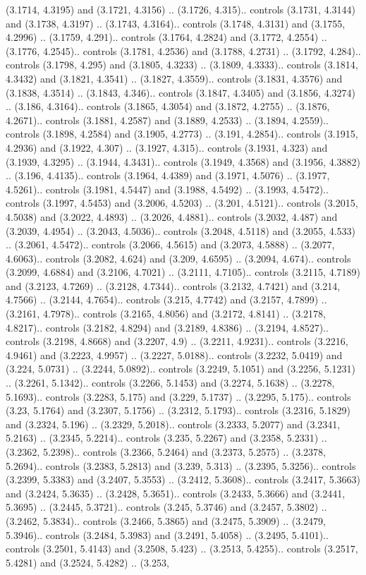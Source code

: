 (3.1714, 4.3195) and (3.1721, 4.3156) .. (3.1726, 4.315).. controls (3.1731, 4.3144) and (3.1738, 4.3197) .. (3.1743, 4.3164).. controls (3.1748, 4.3131) and (3.1755, 4.2996) .. (3.1759, 4.291).. controls (3.1764, 4.2824) and (3.1772, 4.2554) .. (3.1776, 4.2545).. controls (3.1781, 4.2536) and (3.1788, 4.2731) .. (3.1792, 4.284).. controls (3.1798, 4.295) and (3.1805, 4.3233) .. (3.1809, 4.3333).. controls (3.1814, 4.3432) and (3.1821, 4.3541) .. (3.1827, 4.3559).. controls (3.1831, 4.3576) and (3.1838, 4.3514) .. (3.1843, 4.346).. controls (3.1847, 4.3405) and (3.1856, 4.3274) .. (3.186, 4.3164).. controls (3.1865, 4.3054) and (3.1872, 4.2755) .. (3.1876, 4.2671).. controls (3.1881, 4.2587) and (3.1889, 4.2533) .. (3.1894, 4.2559).. controls (3.1898, 4.2584) and (3.1905, 4.2773) .. (3.191, 4.2854).. controls (3.1915, 4.2936) and (3.1922, 4.307) .. (3.1927, 4.315).. controls (3.1931, 4.323) and (3.1939, 4.3295) .. (3.1944, 4.3431).. controls (3.1949, 4.3568) and (3.1956, 4.3882) .. (3.196, 4.4135).. controls (3.1964, 4.4389) and (3.1971, 4.5076) .. (3.1977, 4.5261).. controls (3.1981, 4.5447) and (3.1988, 4.5492) .. (3.1993, 4.5472).. controls (3.1997, 4.5453) and (3.2006, 4.5203) .. (3.201, 4.5121).. controls (3.2015, 4.5038) and (3.2022, 4.4893) .. (3.2026, 4.4881).. controls (3.2032, 4.487) and (3.2039, 4.4954) .. (3.2043, 4.5036).. controls (3.2048, 4.5118) and (3.2055, 4.533) .. (3.2061, 4.5472).. controls (3.2066, 4.5615) and (3.2073, 4.5888) .. (3.2077, 4.6063).. controls (3.2082, 4.624) and (3.209, 4.6595) .. (3.2094, 4.674).. controls (3.2099, 4.6884) and (3.2106, 4.7021) .. (3.2111, 4.7105).. controls (3.2115, 4.7189) and (3.2123, 4.7269) .. (3.2128, 4.7344).. controls (3.2132, 4.7421) and (3.214, 4.7566) .. (3.2144, 4.7654).. controls (3.215, 4.7742) and (3.2157, 4.7899) .. (3.2161, 4.7978).. controls (3.2165, 4.8056) and (3.2172, 4.8141) .. (3.2178, 4.8217).. controls (3.2182, 4.8294) and (3.2189, 4.8386) .. (3.2194, 4.8527).. controls (3.2198, 4.8668) and (3.2207, 4.9) .. (3.2211, 4.9231).. controls (3.2216, 4.9461) and (3.2223, 4.9957) .. (3.2227, 5.0188).. controls (3.2232, 5.0419) and (3.224, 5.0731) .. (3.2244, 5.0892).. controls (3.2249, 5.1051) and (3.2256, 5.1231) .. (3.2261, 5.1342).. controls (3.2266, 5.1453) and (3.2274, 5.1638) .. (3.2278, 5.1693).. controls (3.2283, 5.175) and (3.229, 5.1737) .. (3.2295, 5.175).. controls (3.23, 5.1764) and (3.2307, 5.1756) .. (3.2312, 5.1793).. controls (3.2316, 5.1829) and (3.2324, 5.196) .. (3.2329, 5.2018).. controls (3.2333, 5.2077) and (3.2341, 5.2163) .. (3.2345, 5.2214).. controls (3.235, 5.2267) and (3.2358, 5.2331) .. (3.2362, 5.2398).. controls (3.2366, 5.2464) and (3.2373, 5.2575) .. (3.2378, 5.2694).. controls (3.2383, 5.2813) and (3.239, 5.313) .. (3.2395, 5.3256).. controls (3.2399, 5.3383) and (3.2407, 5.3553) .. (3.2412, 5.3608).. controls (3.2417, 5.3663) and (3.2424, 5.3635) .. (3.2428, 5.3651).. controls (3.2433, 5.3666) and (3.2441, 5.3695) .. (3.2445, 5.3721).. controls (3.245, 5.3746) and (3.2457, 5.3802) .. (3.2462, 5.3834).. controls (3.2466, 5.3865) and (3.2475, 5.3909) .. (3.2479, 5.3946).. controls (3.2484, 5.3983) and (3.2491, 5.4058) .. (3.2495, 5.4101).. controls (3.2501, 5.4143) and (3.2508, 5.423) .. (3.2513, 5.4255).. controls (3.2517, 5.4281) and (3.2524, 5.4282) .. (3.253, 